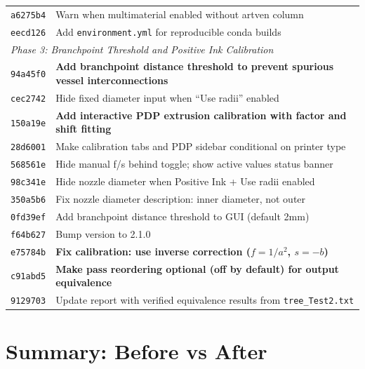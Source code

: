 \documentclass[11pt,a4paper]{article}
\begin{document}
\begin{longtable}{lp{11cm}}
\texttt{a6275b4} & Warn when multimaterial enabled without artven column \\
\texttt{eecd126} & Add \texttt{environment.yml} for reproducible conda builds \\
\midrule
\multicolumn{2}{l}{\textit{Phase 3: Branchpoint Threshold and Positive Ink Calibration}} \\
\midrule
\texttt{94a45f0} & \textbf{Add branchpoint distance threshold to prevent spurious vessel interconnections} \\
\texttt{cec2742} & Hide fixed diameter input when ``Use radii'' enabled \\
\texttt{150a19e} & \textbf{Add interactive PDP extrusion calibration with factor and shift fitting} \\
\texttt{28d6001} & Make calibration tabs and PDP sidebar conditional on printer type \\
\texttt{568561e} & Hide manual f/s behind toggle; show active values status banner \\
\texttt{98c341e} & Hide nozzle diameter when Positive Ink + Use radii enabled \\
\texttt{350a5b6} & Fix nozzle diameter description: inner diameter, not outer \\
\texttt{0fd39ef} & Add branchpoint distance threshold to GUI (default 2mm) \\
\texttt{f64b627} & Bump version to 2.1.0 \\
\texttt{e75784b} & \textbf{Fix calibration: use inverse correction ($f=1/a^2$, $s=-b$)} \\
\texttt{c91abd5} & \textbf{Make pass reordering optional (off by default) for output equivalence} \\
\texttt{9129703} & Update report with verified equivalence results from \texttt{tree\_Test2.txt} \\
\bottomrule
\end{longtable}


\section{Summary: Before vs After}
\end{document}
